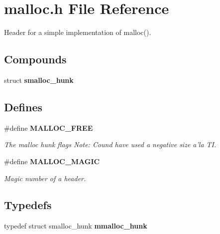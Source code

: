 \section{malloc.h File Reference}
\label{malloc.h}
Header for a simple implementation of malloc(). 


\subsection*{Compounds}
\begin{CompactItemize}
\item 
struct {\bf smalloc\_\-hunk}
\end{CompactItemize}
\subsection*{Defines}
\begin{CompactItemize}
\item 
\label{malloc.h_a0}
\#define {\bf MALLOC\_\-FREE}
\begin{CompactList}\small\item\em The malloc hunk flags Note: Cound have used a negative size a'la TI.\item\end{CompactList}

\item 
\#define {\bf MALLOC\_\-MAGIC}
\begin{CompactList}\small\item\em Magic number of a header.\item\end{CompactList}

\end{CompactItemize}
\subsection*{Typedefs}
\begin{CompactItemize}
\item 
\label{malloc.h_a5}
typedef struct smalloc\_\-hunk {\bf mmalloc\_\-hunk}
\end{CompactItemize}
